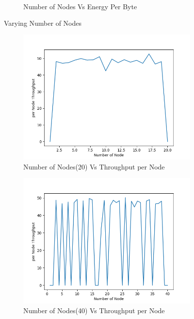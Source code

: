 \begin{figure}[h]
\begin{subfigure}{.5\textwidth}
     \caption{Number of Nodes Vs Energy Per Byte}
     \label{node_energy_mobile_per_byte}
\end{subfigure}
\caption{Varying Number of Nodes}
\label{fig:varyingNode}
\end{figure}
\begin{figure}[h]
\begin{subfigure}{.5\textwidth}
  \centering
  \includegraphics[width=.8\linewidth]{_11_2_mobile/NumberofNode(20)vsperNodeThroughput.png}
     \caption{Number of Nodes(20) Vs Throughput per Node}
 \end{subfigure}
\begin{subfigure}{.5\textwidth}
  \centering
  \includegraphics[width=.8\linewidth]{_11_2_mobile/NumberofNode(40)vsperNodeThroughput.png}
     \caption{Number of Nodes(40) Vs Throughput per Node}
    \end{subfigure}
\begin{subfigure}{.5\textwidth}
    \centering

\end{subfigure}
\end{figure}
